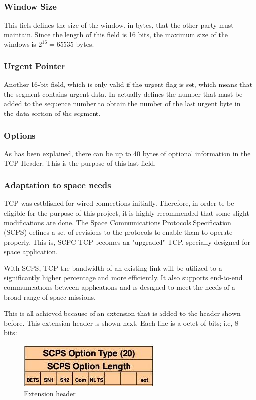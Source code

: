 \subsubsection*{Window Size}
This fiels defines the size of the window, in bytes, that the other party must maintain. Since the length of this field is 16 bits, the maximum size of the windows is $2^{16}=65535$ bytes.  

\subsubsection*{Urgent Pointer}
Another 16-bit field, which is only valid if the urgent flag is set, which means that the segment contains urgent data. In actually defines the number that must be added to the sequence number to obtain the number of the last urgent byte in the data section of the segment. 

\subsubsection*{Options}
As has been explained, there can be up to 40 bytes of optional information in the TCP Header. This is the purpose of this last field. 

\subsubsection*{Adaptation to space needs}
TCP was estblished for wired connections initially. Therefore, in order to be eligible for the purpose of this project, it is highly recommended that some slight modifications are done. The Space Communications Protocols Specification (SCPS) defines a set of revisions to the protocols to enable them to operate properly. This is, SCPC-TCP becomes an "upgraded" TCP, specially designed for space application.  

With SCPS, TCP the bandwidth of an existing link will be utilized to a significantly higher percentage and more efficiently. It also supports end-to-end communications between applications and is designed to meet the needs of a broad range of space missions. 

This is all achieved because of an extension that is added to the header shown before. This extension header is shown next. Each line is a octet of bits; i.e, 8 bits:

\begin{figure}[H]
\begin{center}
\includegraphics[scale=1]{TCP3(extension)}
\caption{Extension header}
\end{center}
\end{figure}


